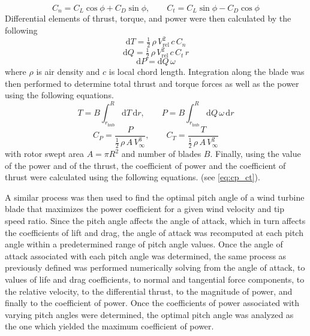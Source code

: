 \documentclass[11pt]{article}
\begin{document}
\begin{equation}
 C_n = C_L\cos\phi + C_D\sin\phi, \qquad C_t = C_L\sin\phi - C_D\cos\phi
\label{eq:cn_ct}
\end{equation}
Differential elements of thrust, torque, and power were then calculated by the following
\begin{equation}
\mathrm{d}T = \tfrac{1}{2}\,\rho\,V_{\mathrm{rel}}^{2}\, c\, C_n
\label{eq:dT}
\end{equation}
\begin{equation}
\mathrm{d}Q = \tfrac{1}{2}\,\rho\,V_{\mathrm{rel}}^{2}\, c\, C_t\, r
\label{eq:dQ}
\end{equation}
\begin{equation}
\mathrm{d}P = \mathrm{d}Q\,\omega
\label{eq:dP}
\end{equation}
where \(\rho\) is air density and \(c\) is local chord length.
Integration along the blade was then performed to determine total thrust and torque forces as well as the power using the following equations.
\begin{equation}
 T = B \int_{r_\text{hub}}^{R} \! \mathrm{d}T\,\mathrm{d}r, \qquad P = B \int_{r_\text{hub}}^{R} \! \mathrm{d}Q\,\omega\,\mathrm{d}r
\label{eq:integrals}
\end{equation}
\begin{equation}
 C_P = \frac{P}{\tfrac{1}{2}\,\rho\,A\,V_\infty^{3}}, \qquad C_T = \frac{T}{\tfrac{1}{2}\,\rho\,A\,V_\infty^{2}}
\label{eq:cp_ct}
\end{equation}
with rotor swept area \(A = \pi R^{2}\) and number of blades \(B\).
Finally, using the value of the power and of the thrust, the coefficient of power and the coefficient of thrust were calculated using the following equations.
(see \eqref{eq:cp_ct}).

A similar process was then used to find the optimal pitch angle of a wind turbine blade that maximizes the power coefficient for a given wind velocity and tip speed ratio. Since the pitch angle affects the angle of attack, which in turn affects the coefficients of lift and drag, the angle of attack was recomputed at each pitch angle within a predetermined range of pitch angle values. Once the angle of attack associated with each pitch angle was determined, the same process as previously defined was performed numerically solving from the angle of attack, to values of life and drag coefficients, to normal and tangential force components, to the relative velocity, to the differential thrust, to the magnitude of power, and finally to the coefficient of power. Once the coefficients of power associated with varying pitch angles were determined, the optimal pitch angle was analyzed as the one which yielded the maximum coefficient of power. 
\end{document}

